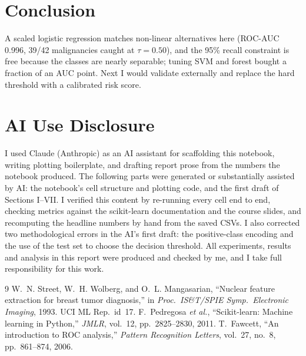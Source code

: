 \documentclass[10pt,conference]{IEEEtran}
\begin{document}
\section{Conclusion}
A scaled logistic regression matches non-linear alternatives here (ROC-AUC
0.996, 39/42 malignancies caught at $\tau=0.50$), and the
95\% recall constraint is free because the classes are nearly separable; tuning SVM and
forest bought a fraction of an AUC point. Next I would validate externally and replace the
hard threshold with a calibrated risk score.

\section*{AI Use Disclosure}
I used Claude (Anthropic) as an AI assistant for scaffolding this notebook, writing plotting
boilerplate, and drafting report prose from the numbers the notebook produced. The
following parts were generated or substantially assisted by AI: the notebook's cell
structure and plotting code, and the first draft of Sections I--VII. I verified this
content by re-running every cell end to end, checking metrics against the scikit-learn
documentation and the course slides, and recomputing the headline numbers by hand from the
saved CSVs. I also corrected two methodological errors in the AI's first draft: the
positive-class encoding and the use of the test set to choose the decision threshold. All
experiments, results and analysis in this report were produced and checked by me, and I
take full responsibility for this work.

\begin{thebibliography}{9}
 W.~N. Street, W.~H. Wolberg, and O.~L. Mangasarian, ``Nuclear feature
extraction for breast tumor diagnosis,'' in \emph{Proc.\ IS\&T/SPIE Symp.\ Electronic
Imaging}, 1993. UCI ML Rep.\ id~17.
 F.~Pedregosa \emph{et al.}, ``Scikit-learn: Machine learning in
Python,'' \emph{JMLR}, vol.~12, pp.~2825--2830, 2011.
 T.~Fawcett, ``An introduction to ROC analysis,'' \emph{Pattern
Recognition Letters}, vol.~27, no.~8, pp.~861--874, 2006.
\end{thebibliography}
\end{document}
